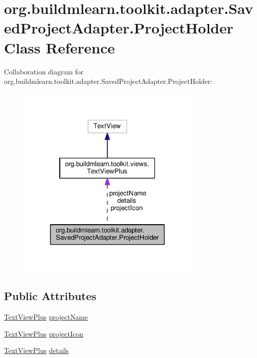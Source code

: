\hypertarget{classorg_1_1buildmlearn_1_1toolkit_1_1adapter_1_1SavedProjectAdapter_1_1ProjectHolder}{}\section{org.\+buildmlearn.\+toolkit.\+adapter.\+Saved\+Project\+Adapter.\+Project\+Holder Class Reference}
\label{classorg_1_1buildmlearn_1_1toolkit_1_1adapter_1_1SavedProjectAdapter_1_1ProjectHolder}


Collaboration diagram for org.\+buildmlearn.\+toolkit.\+adapter.\+Saved\+Project\+Adapter.\+Project\+Holder\+:
\nopagebreak
\begin{figure}[H]
\begin{center}
\leavevmode
\includegraphics[width=251pt]{classorg_1_1buildmlearn_1_1toolkit_1_1adapter_1_1SavedProjectAdapter_1_1ProjectHolder__coll__graph}
\end{center}
\end{figure}
\subsection*{Public Attributes}
\begin{DoxyCompactItemize}
\item 
\hyperlink{classorg_1_1buildmlearn_1_1toolkit_1_1views_1_1TextViewPlus}{Text\+View\+Plus} \hyperlink{classorg_1_1buildmlearn_1_1toolkit_1_1adapter_1_1SavedProjectAdapter_1_1ProjectHolder_a4f7721be11f1285b0bcc94ac357179bb}{project\+Name}
\item 
\hyperlink{classorg_1_1buildmlearn_1_1toolkit_1_1views_1_1TextViewPlus}{Text\+View\+Plus} \hyperlink{classorg_1_1buildmlearn_1_1toolkit_1_1adapter_1_1SavedProjectAdapter_1_1ProjectHolder_ad0c6494c7ac6490ad94a79be926617e5}{project\+Icon}
\item 
\hyperlink{classorg_1_1buildmlearn_1_1toolkit_1_1views_1_1TextViewPlus}{Text\+View\+Plus} \hyperlink{classorg_1_1buildmlearn_1_1toolkit_1_1adapter_1_1SavedProjectAdapter_1_1ProjectHolder_a549b9b88632cdce8c464c8f1046c9f75}{details}
\end{DoxyCompactItemize}



